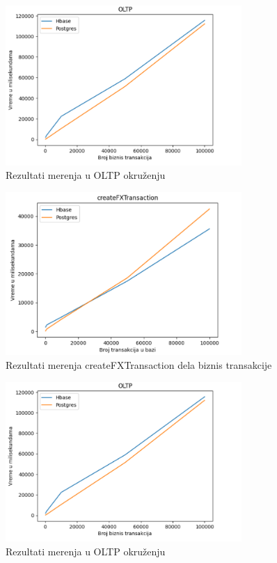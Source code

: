 \documentclass[12pt,oneside]{memoir}
\begin{document}
\begin{figure}[!ht]
  \centering
  \includegraphics[width=0.8\textwidth]{oltp-vizualization.png}
  \caption{Rezultati merenja u OLTP okruženju}
  \label{fig:grafikon}
\end{figure}

\begin{figure}[!ht]
  \centering
  \includegraphics[width=0.8\textwidth]{createFxTransaction-vizualization.png}
  \caption{Rezultati merenja createFXTransaction dela biznis transakcije}
  \label{fig:grafikon}
\end{figure}

\pagebreak 
\begin{figure}[!ht]
  \centering
  \includegraphics[width=0.8\textwidth]{oltp-vizualization.png}
  \caption{Rezultati merenja u OLTP okruženju}
  \label{fig:grafikon}
\end{figure}
\end{document}

